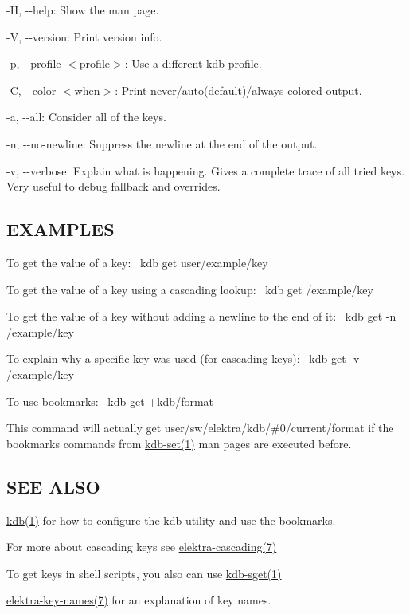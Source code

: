 \begin{DoxyItemize}
\item {\ttfamily -\/H}, {\ttfamily -\/-\/help}\+: Show the man page.
\item {\ttfamily -\/V}, {\ttfamily -\/-\/version}\+: Print version info.
\item {\ttfamily -\/p}, {\ttfamily -\/-\/profile $<$profile$>$}\+: Use a different kdb profile.
\item {\ttfamily -\/C}, {\ttfamily -\/-\/color $<$when$>$}\+: Print never/auto(default)/always colored output.
\item {\ttfamily -\/a}, {\ttfamily -\/-\/all}\+: Consider all of the keys.
\item {\ttfamily -\/n}, {\ttfamily -\/-\/no-\/newline}\+: Suppress the newline at the end of the output.
\item {\ttfamily -\/v}, {\ttfamily -\/-\/verbose}\+: Explain what is happening. Gives a complete trace of all tried keys. Very useful to debug fallback and overrides.
\end{DoxyItemize}

\subsection*{E\+X\+A\+M\+P\+L\+ES}

To get the value of a key\+:~\newline
 {\ttfamily kdb get user/example/key}

To get the value of a key using a cascading lookup\+:~\newline
 {\ttfamily kdb get /example/key}

To get the value of a key without adding a newline to the end of it\+:~\newline
 {\ttfamily kdb get -\/n /example/key}

To explain why a specific key was used (for cascading keys)\+:~\newline
 {\ttfamily kdb get -\/v /example/key}

To use bookmarks\+:~\newline
 {\ttfamily kdb get +kdb/format}

This command will actually get {\ttfamily user/sw/elektra/kdb/\#0/current/format} if the bookmarks commands from \hyperlink{doc_help_kdb-set_md}{kdb-\/set(1)} man pages are executed before.

\subsection*{S\+EE A\+L\+SO}


\begin{DoxyItemize}
\item \hyperlink{doc_help_kdb_md}{kdb(1)} for how to configure the kdb utility and use the bookmarks.
\item For more about cascading keys see \hyperlink{doc_help_elektra-cascading_md}{elektra-\/cascading(7)}
\item To get keys in shell scripts, you also can use \hyperlink{doc_help_kdb-sget_md}{kdb-\/sget(1)}
\item \hyperlink{doc_help_elektra-key-names_md}{elektra-\/key-\/names(7)} for an explanation of key names. 
\end{DoxyItemize}
